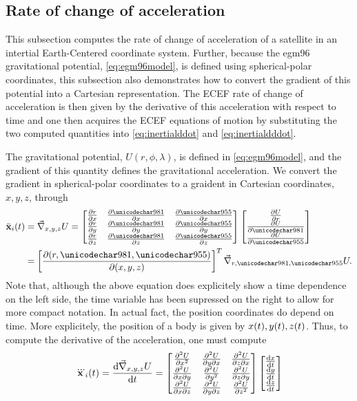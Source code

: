 \subsection{Rate of change of acceleration}
\label{an:rateacc}
This subsection computes the rate of change of acceleration of a satellite in an intertial Earth-Centered coordinate system. Further, because the egm96 gravitational potential, \eqref{eq:egm96model}, is defined using spherical-polar coordinates, this subsection also demonstrates how to convert the gradient of this potential into a Cartesian representation. The ECEF rate of change of acceleration is then given by the derivative of this acceleration with respect to time and one then acquires the ECEF equations of motion by substituting the two computed quantities into \eqref{eq:inertialddot} and \eqref{eq:inertialdddot}.
\par
The gravitational potential, $U(r,\phi,\lambda)$, is defined in \eqref{eq:egm96model}, and the gradient of this quantity defines the gravitational acceleration. We convert the gradient in spherical-polar coordinates to a graident in Cartesian coordinates, $x,y,z$, through
\begin{equation}
\begin{split}
 \ddot{\vct{x}}_i(t) &= \del_{x,y,z}U = 
 \begin{bmatrix}
  \prt{r}{x} & \prt{\phi}{x} & \prt{\lambda}{x}\\
  \prt{r}{y} & \prt{\phi}{y} & \prt{\lambda}{y}\\
  \prt{r}{z} & \prt{\phi}{z} & \prt{\lambda}{z}
 \end{bmatrix}
 \begin{bmatrix}
  \prt{U}{r}\\
  \prt{U}{\phi}\\
  \prt{U}{\lambda}
 \end{bmatrix}\\
 &= \left[\prt{(r,\phi,\lambda)}{(x,y,z)}\right]^T\del_{r,\phi,\lambda}U.
 \end{split}
\end{equation}
Note that, although the above equation does explicitely show a time dependence on the left side, the time variable has been supressed on the right to allow for more compact notation. In actual fact, the position coordinates do depend on time. More explicitely, the position of a body is given by $x(t), y(t), z(t)$. Thus, to compute the derivative of the acceleration, one must compute
\begin{equation}
 \dddot{\mathbf{x}}_i(t) = \frac{\text{d}\vec{\nabla}_{x,y,z}U}{\text{d}t} = 
 \begin{bmatrix}
 \frac{\partial^2U}{\partial x^2} & \frac{\partial^2U}{\partial y\partial x} & \frac{\partial^2U}{\partial z\partial x}\\
 \frac{\partial^2U}{\partial x\partial y} & \frac{\partial^2U}{\partial y^2} & \frac{\partial^2U}{\partial z\partial y}\\
 \frac{\partial^2U}{\partial x\partial z} & \frac{\partial^2U}{\partial y\partial z} & \frac{\partial^2U}{\partial z^2}
 \end{bmatrix}
 \begin{bmatrix}
 \frac{\text{d}x}{\text{d}t} \\ \frac{\text{d}y}{\text{d}t} \\ \frac{\text{d}z}{\text{d}t}  
 \end{bmatrix}
\end{equation}
